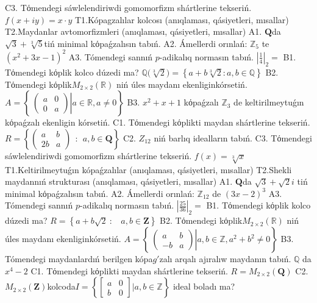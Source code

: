 C3. Tόmendegi sáwlelendiriwdi gomomorfizm shártlerine tekseriń. \(f(x + iy) = x \cdot y\)
T1.Kópagzalılar kolcosı (anıqlaması, qásiyetleri, mısallar)
T2.Maydanlar avtomorfizmleri (anıqlaması, qásiyetleri, mısallar)
A1. \(\mathbf{Q}\)da \(\sqrt{3} + \sqrt[3]{5}\)tiń minimal kόpaǵzalısın tabıń.
A2. Ámellerdi orınlań: \(\mathbb{Z}_{5}\) te \(\left( x^{2} + 3x - 1 \right)^{2}\)
A3. Tómendegi sannıń \(p\)-adikalıq normasın tabıń. \(|\frac{1}{4}|_{2} =\)
B1. Tόmendegi kόplik kolco dúzedi ma? \(\mathbb{Q(}\sqrt[3]{2}) = \left\{ a + b\sqrt[3]{2}:a,b \in \mathbb{Q} \right\}\)
B2. Tόmendegi kόplik\(M_{2 \times 2}\left( \mathbb{R} \right)\) niń úles maydanı ekenliginkórsetiń. \(A = \left\{ \left. \ \begin{pmatrix}
a & 0 \\
0 & a
\end{pmatrix} \right|a\mathbb{\in R},a \neq 0 \right\}\)
B3. \(x^{2} + x + 1\) kόpaǵzalı \(\mathbb{Z}_{3}\) de keltirilmeytuǵın kόpaǵzalı ekenligin kórsetiń.
C1. Tόmendegi kόplikti maydan shártlerine tekseriń. \(R = \left\{ \begin{pmatrix}
a & b \\
2b & a
\end{pmatrix}\ \ :\ \ a,b \in \mathbf{Q} \right\}\)
C2. \(Z_{12}\) niń barlıq idealların tabıń.
C3. Tόmendegi sáwlelendiriwdi gomomorfizm shártlerine tekseriń. \(f(x) = \sqrt[3]{x}\)
T1.Keltirilmeytuǵın kópaǵzalılar (anıqlaması, qásiyetleri, mısallar)
T2.Shekli maydannıń strukturası (anıqlaması, qásiyetleri, mısallar)
A1. \(\mathbf{Q}\)da \(\sqrt{3} + \sqrt{2}i\) tiń minimal kόpaǵzalısın tabıń.
A2. Ámellerdi orınlań: \(\mathbb{Z}_{12}\) de \((3x - 2)^{3}\)
A3. Tómendegi sannıń \(p\)-adikalıq normasın tabıń. \(|\frac{25}{36}|_{2} =\)
B1. Tόmendegi kόplik kolco dúzedi ma? \(R = \left\{ a + b\sqrt{2}\ :\ \ \ \ a,b \in \mathbf{Z} \right\}\)
B2. Tόmendegi kόplik\(M_{2 \times 2}\left( \mathbb{R} \right)\) niń úles maydanı ekenliginkórsetiń. \(A = \left\{ \left. \ \begin{pmatrix}
a & b \\
 - b & a
\end{pmatrix} \right|a,b\mathbb{\in Z},a^{2} + b^{2} \neq 0 \right\}\)
B3. Tómendegi maydanlardıń berilgen kópa\(g'\)zalı arqalı ajıralıw maydanın tabıń. \(\mathbb{Q}\) da \(x^{4} - 2\)
C1. Tόmendegi kόplikti maydan shártlerine tekseriń. \(R = M_{2 \times 2}\left( \mathbf{Q} \right)\)
C2. \(M_{2 \times 2}\left( \mathbf{Z} \right)\)kolcoda\(I = \left\{ \begin{bmatrix}
a & 0 \\
b & 0
\end{bmatrix}|a,b\mathbb{\in Z} \right\}\) ideal boladı ma?
